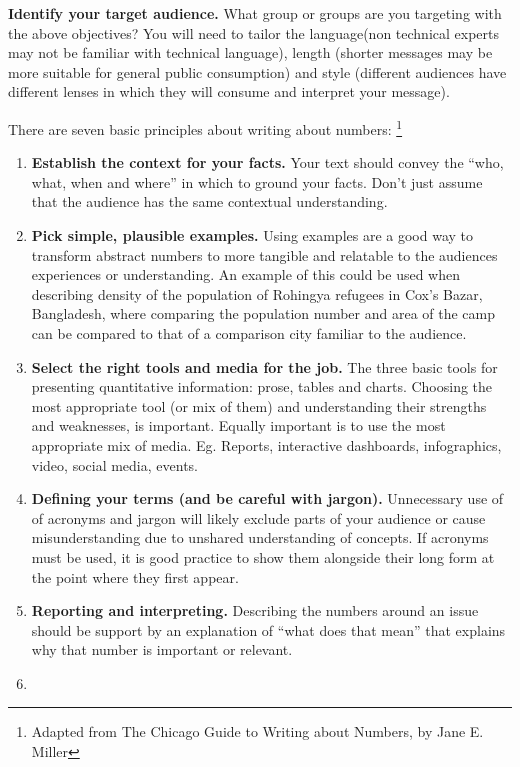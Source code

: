 \documentclass[
  a4paper,
  onecolumn,
  oneside]{book}
\begin{document}
\textbf{Identify your target audience.} What group or groups are you
targeting with the above objectives? You will need to tailor the
language(non technical experts may not be familiar with technical
language), length (shorter messages may be more suitable for general
public consumption) and style (different audiences have different lenses
in which they will consume and interpret your message).

There are seven basic principles about writing about numbers:
\footnote{Adapted from The Chicago Guide to Writing about Numbers, by
  Jane E. Miller}

\begin{enumerate}
\def\labelenumi{\arabic{enumi}.}
\item
  \textbf{Establish the context for your facts.} Your text should convey
  the ``who, what, when and where'' in which to ground your facts. Don't
  just assume that the audience has the same contextual understanding.
\item
  \textbf{Pick simple, plausible examples.} Using examples are a good
  way to transform abstract numbers to more tangible and relatable to
  the audiences experiences or understanding. An example of this could
  be used when describing density of the population of Rohingya refugees
  in Cox's Bazar, Bangladesh, where comparing the population number and
  area of the camp can be compared to that of a comparison city familiar
  to the audience.
\item
  \textbf{Select the right tools and media for the job.} The three basic
  tools for presenting quantitative information: prose, tables and
  charts. Choosing the most appropriate tool (or mix of them) and
  understanding their strengths and weaknesses, is important. Equally
  important is to use the most appropriate mix of media. Eg. Reports,
  interactive dashboards, infographics, video, social media, events.
\item
  \textbf{Defining your terms (and be careful with jargon).} Unnecessary
  use of of acronyms and jargon will likely exclude parts of your
  audience or cause misunderstanding due to unshared understanding of
  concepts. If acronyms must be used, it is good practice to show them
  alongside their long form at the point where they first appear.
\item
  \textbf{Reporting and interpreting.} Describing the numbers around an
  issue should be support by an explanation of ``what does that mean''
  that explains why that number is important or relevant.
\item

\end{enumerate}
\end{document}
